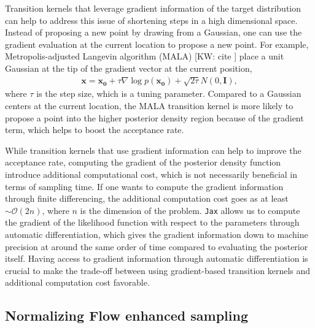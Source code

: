 \documentclass[twocolumn]{aastex631}
\newcommand{\kw}[1]{{\color{rb4}[KW: #1 ]}}
\begin{document}
Transition kernels that leverage gradient information of the target
distribution can help to address this issue of shortening steps in a high
dimensional space. Instead of proposing a new point by drawing from a Gaussian,
one can use the gradient evaluation at the current location to propose a new
point. For example, Metropolis-adjusted Langevin algorithm (MALA) \kw{cite}
place a unit Gaussian at the tip of the gradient vector at the current position,
\begin{align}
    \mathbf{x} = \mathbf{x_0} + \tau \nabla\log{p(\mathbf{x_0})} + \sqrt{2\tau}N(0,\mathbf{I}),
\end{align}
where $\tau$ is the step size, which is a tuning parameter. Compared to a
Gaussian centers at the current location, the MALA transition kernel is more
likely to propose a point into the higher posterior density region because of
the gradient term, which helps to boost the acceptance rate.

While transition kernels that use gradient information can help to improve the
acceptance rate, computing the gradient of the posterior density function
introduce additional computational cost, which is not necessarily beneficial in
terms of sampling time. If one wants to compute the gradient information through
finite differencing, the additional computation cost goes as at least $\sim
\mathcal{O}(2n)$, where $n$ is the dimension of the problem. \texttt{Jax} allows
us to compute the gradient of the likelihood function with respect to the
parameters through automatic differentiation, which gives the gradient
information down to machine precision at around the same order of time compared
to evaluating the posterior itself. Having access to gradient information
through automatic differentiation is crucial to make the trade-off between using
gradient-based transition kernels and additional computation cost favorable.

\subsection{Normalizing Flow enhanced sampling}
\label{sec:flow}
\end{document}
